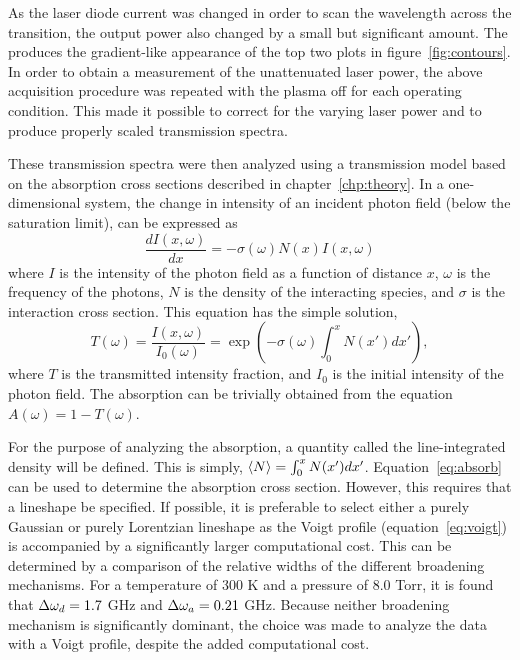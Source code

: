 As the laser diode current was changed in order to scan the wavelength across
the transition, the output power also changed by a small but significant amount.
The produces the gradient-like appearance of the top two plots in
figure~\ref{fig:contours}. In order to obtain a measurement of the unattenuated
laser power, the above acquisition procedure was repeated with the plasma off
for each operating condition. This made it possible to correct for the varying
laser power and to produce properly scaled transmission spectra.

These transmission spectra were then analyzed using a transmission model based
on the absorption cross sections described in chapter~\ref{chp:theory}. In a
one-dimensional system, the change in intensity of an incident photon field
(below the saturation limit), can be expressed as
\begin{equation}
  \frac{dI(x, \omega)}{dx} = -\sigma(\omega) N(x) I(x, \omega)
\end{equation}
where $I$ is the intensity of the photon field as a function of distance $x$,
$\omega$ is the frequency of the photons, $N$ is the density of the interacting
species, and $\sigma$ is the interaction cross section. This equation has the
simple solution,
\begin{equation}
  T(\omega) = \frac{I(x, \omega)}{I_0(\omega)}
            = \exp(-\sigma(\omega) \int_0^x N(x') dx'),
  \label{eq:transmitted}
\end{equation}
where $T$ is the transmitted intensity fraction, and $I_0$ is the initial
intensity of the photon field. The absorption can be trivially obtained from the
equation $A(\omega) = 1 - T(\omega)$.

For the purpose of analyzing the absorption, a quantity called the
line-integrated density will be defined. This is simply, $\langle N \rangle = \int_0^x
N(x')dx'$. Equation~\ref{eq:absorb} can be used to determine the absorption
cross section. However, this requires that a lineshape be specified. If
possible, it is preferable to select either a purely Gaussian or purely
Lorentzian lineshape as the Voigt profile (equation~\ref{eq:voigt}) is
accompanied by a significantly larger computational cost. This can be determined
by a comparison of the relative widths of the different broadening mechanisms.
For a temperature of 300 K and a pressure of 8.0 Torr, it is found that $\Delta \omega_d =
1.7$ GHz and $\Delta \omega_a = 0.21$ GHz. Because neither broadening mechanism is
significantly dominant, the choice was made to analyze the data with a Voigt
profile, despite the added computational cost.

